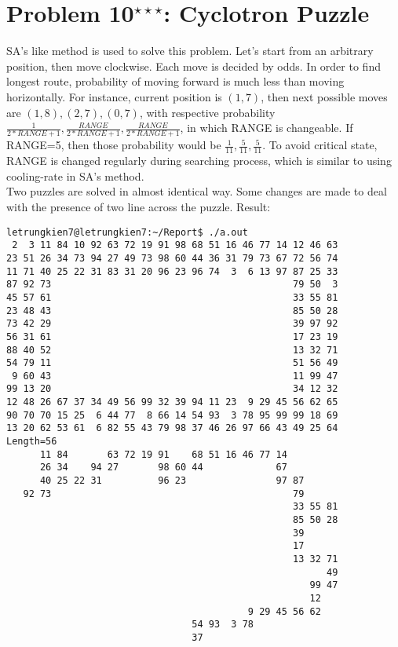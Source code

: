 \documentclass[11pt]{article}
\begin{document}
\section{Problem 10${}^{\star\star\star}$: \normalsize Cyclotron Puzzle}
\indent SA's like method is used to solve this problem. Let's start from an arbitrary position, then move clockwise. Each move is decided by odds. In order to find longest route, probability of moving forward is much less than moving horizontally. For instance, current position is $(1,7)$, then next possible moves are $(1,8),(2,7),(0,7)$, with respective probability $\frac{1}{2*RANGE+1}, \frac{RANGE}{2*RANGE+1}, \frac{RANGE}{2*RANGE+1}$, in which RANGE is changeable. If RANGE=5, then those probability would be $\frac{1}{11},\frac{5}{11},\frac{5}{11}$. To avoid critical state, RANGE is changed regularly during searching process, which is similar to using cooling-rate in SA's method.\\
\indent Two puzzles are solved in almost identical way. Some changes are made to deal with the presence of two line across the puzzle. Result:
\begin{verbatim}
letrungkien7@letrungkien7:~/Report$ ./a.out 
 2  3 11 84 10 92 63 72 19 91 98 68 51 16 46 77 14 12 46 63 
23 51 26 34 73 94 27 49 73 98 60 44 36 31 79 73 67 72 56 74 
11 71 40 25 22 31 83 31 20 96 23 96 74  3  6 13 97 87 25 33 
87 92 73                                           79 50  3 
45 57 61                                           33 55 81 
23 48 43                                           85 50 28 
73 42 29                                           39 97 92 
56 31 61                                           17 23 19 
88 40 52                                           13 32 71 
54 79 11                                           51 56 49 
 9 60 43                                           11 99 47 
99 13 20                                           34 12 32 
12 48 26 67 37 34 49 56 99 32 39 94 11 23  9 29 45 56 62 65 
90 70 70 15 25  6 44 77  8 66 14 54 93  3 78 95 99 99 18 69 
13 20 62 53 61  6 82 55 43 79 98 37 46 26 97 66 43 49 25 64 
Length=56
      11 84       63 72 19 91    68 51 16 46 77 14          
      26 34    94 27       98 60 44             67          
      40 25 22 31          96 23                97 87       
   92 73                                           79       
                                                   33 55 81 
                                                   85 50 28 
                                                   39       
                                                   17       
                                                   13 32 71 
                                                         49 
                                                      99 47 
                                                      12    
                                           9 29 45 56 62    
                                 54 93  3 78                
                                 37                         
\end{verbatim}
\end{document}

